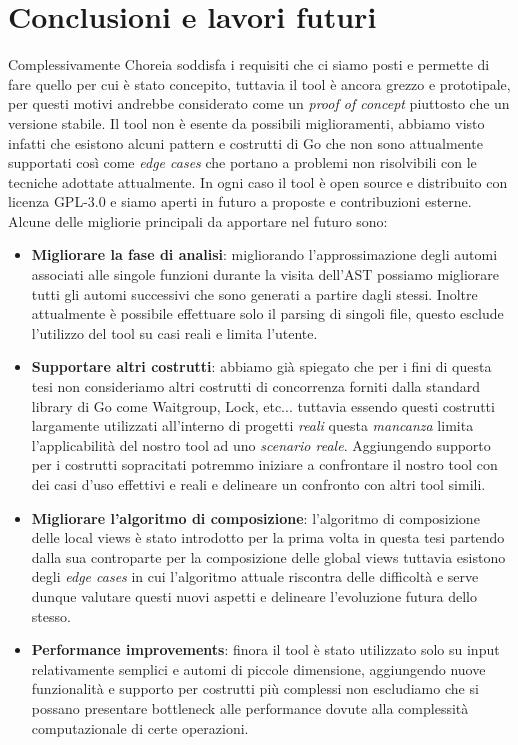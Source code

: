 \chapter{Conclusioni e lavori futuri}
Complessivamente Choreia soddisfa i requisiti che ci siamo posti e permette di fare quello per cui è stato concepito, tuttavia il tool è ancora grezzo e prototipale, per questi motivi andrebbe considerato come un \emph{proof of concept} piuttosto che un versione stabile. Il tool non è esente da possibili miglioramenti, abbiamo visto infatti che esistono alcuni pattern e costrutti di Go che non sono attualmente supportati così come \emph{edge cases} che portano a problemi non risolvibili con le tecniche adottate attualmente. In ogni caso il tool è open source e distribuito con licenza GPL-3.0 e siamo aperti in futuro a proposte e contribuzioni esterne.\bigskip \\
Alcune delle migliorie principali da apportare nel futuro sono:
\begin{itemize}
    \item \textbf{Migliorare la fase di analisi}: migliorando l'approssimazione degli automi associati alle singole funzioni durante la visita dell'AST possiamo migliorare tutti gli automi successivi che sono generati a partire dagli stessi. Inoltre attualmente è possibile effettuare solo il parsing di singoli file, questo esclude l'utilizzo del tool su casi reali e limita l'utente.
    \item \textbf{Supportare altri costrutti}: abbiamo già spiegato che per i fini di questa tesi non consideriamo altri costrutti di concorrenza forniti dalla standard library di Go come Waitgroup, Lock, etc... tuttavia essendo questi costrutti largamente utilizzati all'interno di progetti \emph{reali} questa \emph{mancanza} limita l'applicabilità del nostro tool ad uno \emph{scenario reale}. Aggiungendo supporto per i costrutti sopracitati potremmo iniziare a confrontare il nostro tool con dei casi d'uso effettivi e reali e delineare un confronto con altri tool simili.
    \item \textbf{Migliorare l'algoritmo di composizione}: l'algoritmo di composizione delle local views è stato introdotto per la prima volta in questa tesi partendo dalla sua controparte per la composizione delle global views tuttavia esistono degli \emph{edge cases} in cui l'algoritmo attuale riscontra delle difficoltà e serve dunque valutare questi nuovi aspetti e delineare l'evoluzione futura dello stesso.
    \item \textbf{Performance improvements}: finora il tool è stato utilizzato solo su input relativamente semplici e automi di piccole dimensione, aggiungendo nuove funzionalità e supporto per costrutti più complessi non escludiamo che si possano presentare bottleneck alle performance dovute alla complessità computazionale di certe operazioni.
\end{itemize}
